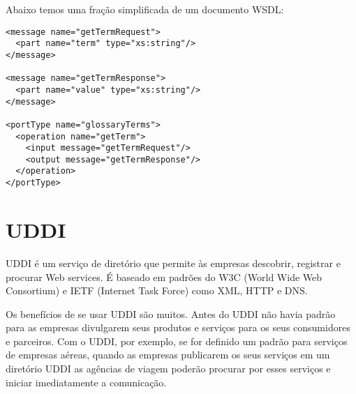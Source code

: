 Abaixo temos uma fração simplificada de um documento WSDL:

\lstset{language=XML}
\begin{lstlisting}[title={`WSDL'}]
<message name="getTermRequest">
  <part name="term" type="xs:string"/>
</message>

<message name="getTermResponse">
  <part name="value" type="xs:string"/>
</message>

<portType name="glossaryTerms">
  <operation name="getTerm">
    <input message="getTermRequest"/>
    <output message="getTermResponse"/>
  </operation>
</portType> 
\end{lstlisting}

\section{UDDI}

UDDI é um serviço de diretório que permite às empresas descobrir, registrar e procurar Web services. É baseado em padrões do W3C (World Wide Web Consortium) e IETF (Internet Task Force) como XML, HTTP e DNS.

Os benefícios de se usar UDDI são muitos. Antes do UDDI não havia padrão para as empresas divulgarem seus produtos e serviços para os seus consumidores e parceiros. Com o UDDI, por exemplo, se for definido um padrão para serviços de empresas aéreas, quando as empresas publicarem os seus serviços em um diretório UDDI as agências de viagem poderão procurar por esses serviços e iniciar imediatamente a comunicação.












